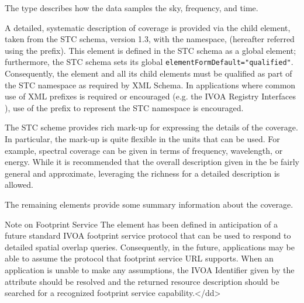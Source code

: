 \documentclass[11pt,a4paper]{ivoa}
\begin{document}
The  type describes how the data samples the
sky, frequency, and time.  




A detailed, systematic description of coverage is provided via the
child  element, taken from
the STC schema, version 1.3, with the namespace,
 (hereafter
referred using the  prefix).  This element is defined
in the STC schema as a global element; furthermore, the STC schema
sets its global \verb|elementFormDefault="qualified"|.
Consequently, the  element
and all its child elements must be qualified as part of the STC
namespace as required by XML Schema.
In applications where common use of XML prefixes is required or
encouraged (e.g. the IVOA Registry Interfaces \citep{RI}),
use of the  prefix to represent the STC namespace is
encouraged.   


\begin{admonition}
The STC scheme provides rich mark-up for expressing the
       details of the coverage.  In particular, the mark-up is quite
       flexible in the units that can be used.  For example, spectral
       coverage can be given in terms of frequency, wavelength, or
       energy.  While it is recommended that the overall description
       given in the  be
       fairly general and approximate, leveraging the richness for a
       detailed description is allowed.
\end{admonition}



The remaining elements provide some summary information about the
coverage. 



\begin{admonition}{Note on Footprint Service}
The  element has been defined in
       anticipation of a future standard IVOA footprint service
       protocol that can be used to respond to detailed spatial
       overlap queries.  Consequently, in the future, applications may
       be able to assume the protocol that footprint service URL
       supports.  When an application is unable to make any
       assumptions, the IVOA Identifier given by the attribute should
       be resolved and the returned resource description should be
       searched for a recognized footprint service capability.</dd> 
\end{admonition}
\end{document}
